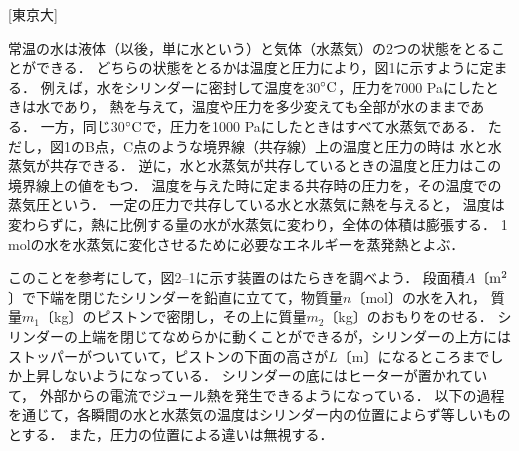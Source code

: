 



\noindent{} [東京大]

常温の水は液体（以後，単に水という）と気体（水蒸気）の2つの状態をとることができる．
どちらの状態をとるかは温度と圧力により，図1に示すように定まる．
例えば，水をシリンダーに密封して温度を30${}^\circ\mathrm{C}$，圧力を7000 Paにしたときは水であり，
熱を与えて，温度や圧力を多少変えても全部が水のままである．
一方，同じ30${}^\circ\mathrm{C}$で，圧力を1000 Paにしたときはすべて水蒸気である．
ただし，図1のB点，C点のような境界線（共存線）上の温度と圧力の時は
水と水蒸気が共存できる．
逆に，水と水蒸気が共存しているときの温度と圧力はこの境界線上の値をもつ．
温度を与えた時に定まる共存時の圧力を，その温度での蒸気圧という．
一定の圧力で共存している水と水蒸気に熱を与えると，
温度は変わらずに，熱に比例する量の水が水蒸気に変わり，全体の体積は膨張する．
1 molの水を水蒸気に変化させるために必要なエネルギーを蒸発熱とよぶ．

このことを参考にして，図2--1に示す装置のはたらきを調べよう．
段面積$A$〔$\mathrm{m^2}$〕で下端を閉じたシリンダーを鉛直に立てて，物質量$n$〔mol〕の水を入れ，
質量$m_1$〔kg〕のピストンで密閉し，その上に質量$m_2$〔kg〕のおもりをのせる．
シリンダーの上端を閉じてなめらかに動くことができるが，シリンダーの上方にはストッパーがついていて，ピストンの下面の高さが$L$〔m〕になるところまでしか上昇しないようになっている．
シリンダーの底にはヒーターが置かれていて，
外部からの電流でジュール熱を発生できるようになっている．
以下の過程を通じて，各瞬間の水と水蒸気の温度はシリンダー内の位置によらず等しいものとする．
また，圧力の位置による違いは無視する．

